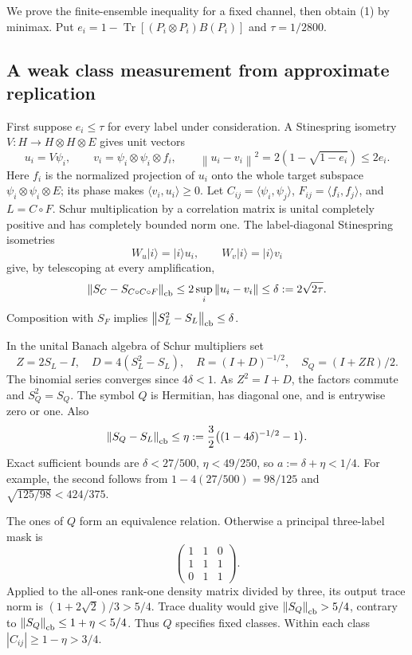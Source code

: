 \documentclass[11pt]{article}
\newcommand{\Tr}{\operatorname{Tr}}
\newcommand{\norm}[1]{\left\lVert#1\right\rVert}
\begin{document}
We prove the finite-ensemble inequality for a fixed channel, then obtain (1) by minimax. Put $e_i=1-\Tr[(P_i\otimes P_i)B(P_i)]$ and $\tau=1/2800$.

\subsection{A weak class measurement from approximate replication}

First suppose $e_i\le\tau$ for every label under consideration. A Stinespring isometry $V:H\to H\otimes H\otimes E$ gives unit vectors
\[
u_i=V\psi_i,\qquad v_i=\psi_i\otimes\psi_i\otimes f_i,
\qquad \norm{u_i-v_i}^2=2(1-\sqrt{1-e_i})\le2e_i.
\]
Here $f_i$ is the normalized projection of $u_i$ onto the whole target subspace $\psi_i\otimes\psi_i\otimes E$; its phase makes $\langle v_i,u_i\rangle\ge0$.
Let $C_{ij}=\langle\psi_i,\psi_j\rangle$, $F_{ij}=\langle f_i,f_j\rangle$, and $L=C\circ F$. Schur multiplication by a correlation matrix is unital completely positive and has completely bounded norm one. The label-diagonal Stinespring isometries
\[
W_u|i\rangle=|i\rangle u_i,\qquad W_v|i\rangle=|i\rangle v_i
\]
give, by telescoping at every amplification,
\[
\norm{S_C-S_{C\circ C\circ F}}_{\rm cb}\le2\sup_i\norm{u_i-v_i}
\le\delta:=2\sqrt{2\tau}.
\]
Composition with $S_F$ implies $\norm{S_L^2-S_L}_{\rm cb}\le\delta$.

In the unital Banach algebra of Schur multipliers set
\[
Z=2S_L-I,\quad D=4(S_L^2-S_L),\quad
R=(I+D)^{-1/2},\quad S_Q=(I+ZR)/2.
\]
The binomial series converges since $4\delta<1$. As $Z^2=I+D$, the factors commute and $S_Q^2=S_Q$. The symbol $Q$ is Hermitian, has diagonal one, and is entrywise zero or one. Also
\[
\norm{S_Q-S_L}_{\rm cb}\le
\eta:=\frac32\bigl((1-4\delta)^{-1/2}-1\bigr).
\]
Exact sufficient bounds are $\delta<27/500$, $\eta<49/250$, so $a:=\delta+\eta<1/4$. For example, the second follows from
$1-4(27/500)=98/125$ and $\sqrt{125/98}<424/375$.

The ones of $Q$ form an equivalence relation. Otherwise a principal three-label mask is
\[
\begin{pmatrix}1&1&0\\1&1&1\\0&1&1\end{pmatrix}.
\]
Applied to the all-ones rank-one density matrix divided by three, its output trace norm is $(1+2\sqrt2)/3>5/4$. Trace duality would give $\norm{S_Q}_{\rm cb}>5/4$, contrary to $\norm{S_Q}_{\rm cb}\le1+\eta<5/4$. Thus $Q$ specifies fixed classes. Within each class $|C_{ij}|\ge1-\eta>3/4$.
\end{document}
